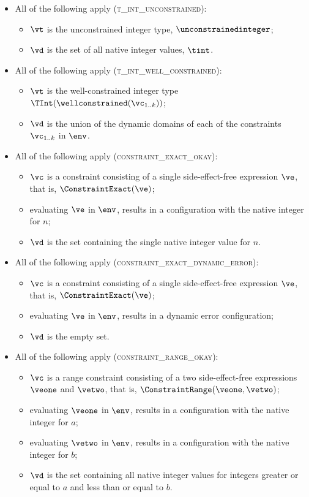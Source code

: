 \begin{itemize}
  \item All of the following apply (\textsc{t\_int\_unconstrained}):
  \begin{itemize}
    \item $\vt$ is the unconstrained integer type, $\unconstrainedinteger$;
    \item $\vd$ is the set of all native integer values, $\tint$.
  \end{itemize}

  \item All of the following apply (\textsc{t\_int\_well\_constrained}):
  \begin{itemize}
    \item $\vt$ is the well-constrained integer type $\TInt(\wellconstrained(\vc_{1..k}))$;
    \item $\vd$ is the union of the dynamic domains of each of the constraints $\vc_{1..k}$ in $\env$.
  \end{itemize}

  \item All of the following apply (\textsc{constraint\_exact\_okay}):
  \begin{itemize}
    \item $\vc$ is a constraint consisting of a single side-effect-free expression $\ve$, that is, $\ConstraintExact(\ve)$;
    \item evaluating $\ve$ in $\env$, results in a configuration with the native integer for $n$;
    \item $\vd$ is the set containing the single native integer value for $n$.
  \end{itemize}

  \item All of the following apply (\textsc{constraint\_exact\_dynamic\_error}):
  \begin{itemize}
    \item $\vc$ is a constraint consisting of a single side-effect-free expression $\ve$, that is, $\ConstraintExact(\ve)$;
    \item evaluating $\ve$ in $\env$, results in a dynamic error configuration;
    \item $\vd$ is the empty set.
  \end{itemize}

  \item All of the following apply (\textsc{constraint\_range\_okay}):
  \begin{itemize}
    \item $\vc$ is a range constraint consisting of a two side-effect-free expressions $\veone$ and $\vetwo$, that is, $\ConstraintRange(\veone, \vetwo)$;
    \item evaluating $\veone$ in $\env$, results in a configuration with the native integer for $a$;
    \item evaluating $\vetwo$ in $\env$, results in a configuration with the native integer for $b$;
    \item $\vd$ is the set containing all native integer values for integers greater or equal to $a$ and less than or equal to $b$.
  \end{itemize}


\end{itemize}
